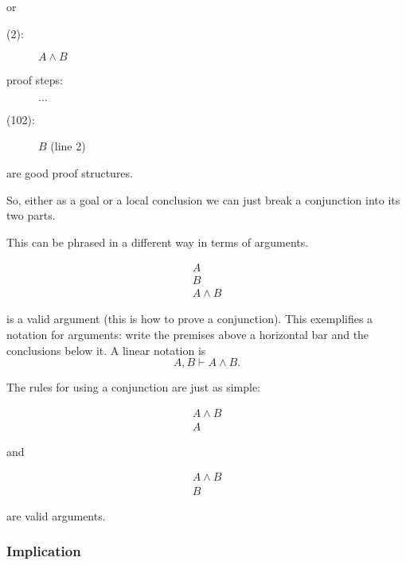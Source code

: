 \documentclass[12pt]{article}
\begin{document}
or 

\begin{description}

\item[(2):]  $A \wedge B$

\item[proof steps:]  $\ldots$

\item[(102):]  $B$ (line 2)

\end{description}

are good proof structures.

So, either as a goal or a local conclusion we can just break a
conjunction into its two parts.

This can be phrased in a different way in terms of arguments.

$$\begin{array}{c}

A \\

B \\

\hline

A \wedge B\end{array}$$

is a valid argument (this is how to prove a conjunction).  This exemplifies a notation for arguments:  write the premises above a horizontal
bar and the conclusions below it.  A linear notation is $$A, B  \vdash A \wedge B.$$

The rules for using a conjunction are just as simple:

$$\begin{array}{c}

A \wedge B\\

\hline

A\end{array}$$

and 

$$\begin{array}{c}

A \wedge B\\

\hline

B\end{array}$$

are valid arguments.

\subsubsection{Implication}
\end{document}
